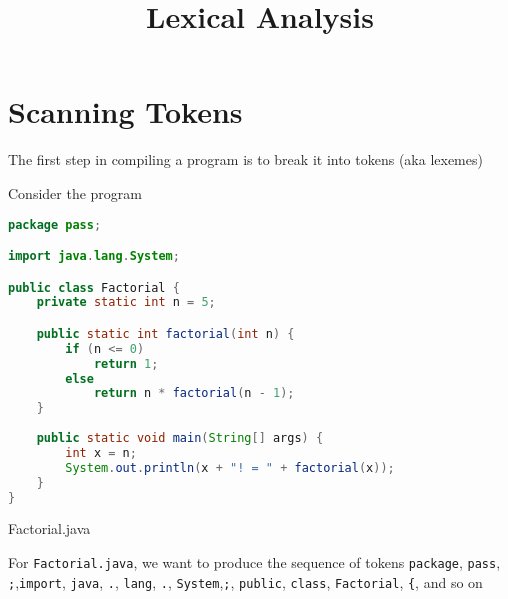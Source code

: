 \documentclass[8pt,a4paper,compress]{beamer}
\title{Lexical Analysis}
\date{}
\begin{document}
\begin{frame}
\vfill
\titlepage
\end{frame}

\section{Scanning Tokens}
\begin{frame}[fragile]
\pause

The first step in compiling a program is to break it into tokens (aka lexemes)

\pause\bigskip

Consider the \jmm program

\begin{tcolorbox}[enhanced,drop shadow southwest,sharp corners,size=fbox,colback=white,fontlower=\small\ttfamily,collower=silver900]

\begin{lstlisting}[language=Java,style=focusin]
package pass;

import java.lang.System;

public class Factorial {
    private static int n = 5;

    public static int factorial(int n) {
        if (n <= 0)
            return 1;
        else
            return n * factorial(n - 1);
    }
    
    public static void main(String[] args) {
        int x = n;
        System.out.println(x + "! = " + factorial(x));
    }
}
\end{lstlisting}

\tcblower
\begin{minipage}[t][.25cm][t]{\textwidth}
Factorial.java
\end{minipage}
\end{tcolorbox}

\pause

For \lstinline{Factorial.java}, we want to produce the sequence of tokens \lstinline{package}, \lstinline{pass}, \lstinline{;},\lstinline{import}, \lstinline{java}, \lstinline{.}, \lstinline{lang}, \lstinline{.}, \lstinline{System},\lstinline{;}, \lstinline{public}, \lstinline{class}, \lstinline{Factorial}, \lstinline${$, and so on
\end{frame}
\end{document}
